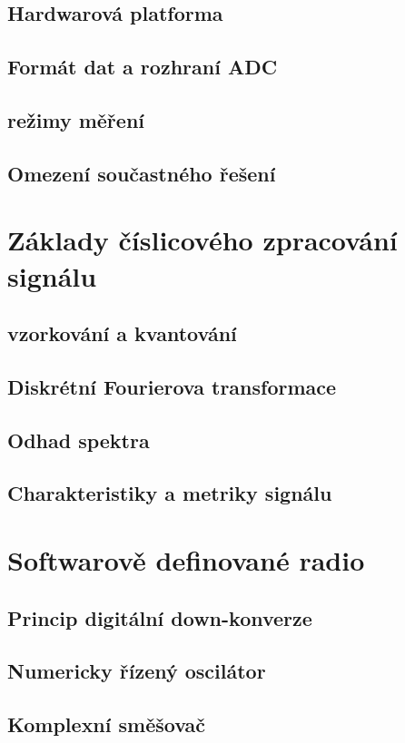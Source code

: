 \subsection{Hardwarová platforma}
\subsection{Formát dat a rozhraní ADC}
\subsection{režimy měření}
\subsection{Omezení součastného řešení}





\section{Základy číslicového zpracování signálu}
\subsection{vzorkování a kvantování}
\subsection{Diskrétní Fourierova transformace}
\subsection{Odhad spektra}
\subsection{Charakteristiky a metriky signálu}


\section{Softwarově definované radio}


\subsection{Princip digitální down-konverze}
\subsection{Numericky řízený oscilátor}
\subsection{Komplexní směšovač}


